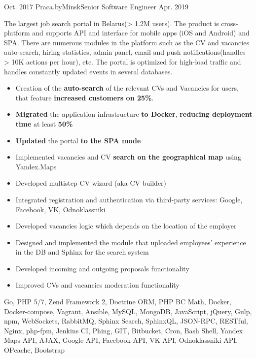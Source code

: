 \begin{experiences}
  \experience
    {Oct. 2017} {Praca.by}{Minsk}{Senior Software Engineer}
    {Apr. 2019}
    {
      The largest job search portal in Belarus(> 1.2M users).
      The product is cross-platform and supports API and interface for mobile apps (iOS and Android) and SPA.
      There are numerous modules in the platform such as the CV and vacancies auto-search, hiring statistics, admin panel,
      email and push notifications(handles > 10K actions per hour), etc. The portal is optimized for high-load traffic and
      handles constantly updated events in several databases.
      \begin{itemize}
        \item {Creation of the \textbf{auto-search} of the relevant CVs and Vacancies for users, that feature \textbf{increased customers on 25\%}.}
        \item {\textbf{Migrated} the application infrastructure \textbf{to Docker}, \textbf{reducing deployment time} at least \textbf{50\%}}
        \item {\textbf{Updated} the portal \textbf{to the SPA mode}}
        \item {Implemented vacancies and CV \textbf{search on the geographical map} using Yandex.Maps}
        \item {Developed multistep CV wizard (aka CV builder)}
        \item {Integrated registration and authentication via third-party services: Google, Facebook, VK, Odnoklassniki}
        \item {Developed vacancies logic which depends on the location of the employer}
        \item {Designed and implemented the module that uploaded employees' experience in the DB and Sphinx for the search system}
        \item {Developed incoming and outgoing proposals functionality}
        \item {Improved CVs and vacancies moderation functionality}
      \end{itemize}
    }
    {
      Go, PHP 5/7, Zend Framework 2, Doctrine ORM, PHP BC Math, Docker, Docker-compose, Vagrant, Ansible,
      MySQL, MongoDB, JavaScript, jQuery, Gulp, npm, WebSockets, RabbitMQ, Sphinx Search, SphinxQL, JSON-RPC, RESTful,
      Nginx, php-fpm, Jenkins CI, Phing, GIT, Bitbucket, Cron, Bash Shell, Yandex Maps API, AJAX, Google API, Facebook API, VK API,
      Odnoklassniki API, OPcache, Bootstrap
    }
  \emptySeparator


\end{experiences}
